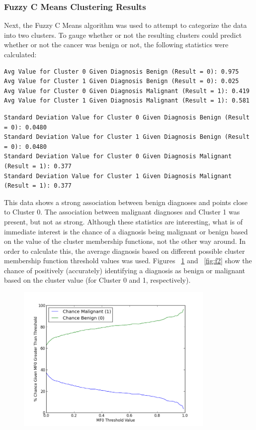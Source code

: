 \documentclass{article}
\begin{document}
\subsubsection*{Fuzzy C Means Clustering Results}
Next, the Fuzzy C Means algorithm was used to attempt to categorize the data 
into two clusters.  To gauge whether or not the resulting clusters could 
predict whether or not the cancer was benign or not, the following statistics were calculated:
\vspace*{1\baselineskip}      
\begin{verbatim}
Avg Value for Cluster 0 Given Diagnosis Benign (Result = 0): 0.975
Avg Value for Cluster 1 Given Diagnosis Benign (Result = 0): 0.025
Avg Value for Cluster 0 Given Diagnosis Malignant (Result = 1): 0.419
Avg Value for Cluster 1 Given Diagnosis Malignant (Result = 1): 0.581
\end{verbatim}
\vspace*{1\baselineskip}      
\begin{verbatim}
Standard Deviation Value for Cluster 0 Given Diagnosis Benign (Result = 0): 0.0480
Standard Deviation Value for Cluster 1 Given Diagnosis Benign (Result = 0): 0.0480
Standard Deviation Value for Cluster 0 Given Diagnosis Malignant (Result = 1): 0.377
Standard Deviation Value for Cluster 1 Given Diagnosis Malignant (Result = 1): 0.377
\end{verbatim}
\vspace*{1\baselineskip}      
This data shows a strong association between benign diagnoses and points 
close to Cluster 0.  The association between malignant diagnoses and Cluster 1 was present, but not as strong.
Although these statistics are interesting, what is of immediate interest is 
the chance of a diagnosis being malignant or benign based on the value of the 
cluster membership functions, not the other way around.  In order to calculate 
this, the average diagnosis based on different possible cluster membership 
function threshold values was used.  Figures ~\ref{fig:f1} and ~\ref{fig:f2} 
show the chance of positively (accurately) identifying a diagnosis as benign 
or malignant based on the cluster value (for Cluster 0 and 1, respectively).
\begin{figure}[h!]
  \centering
    \includegraphics[width=0.85\textwidth]{figure_1.png}
  \label{fig:f1}
\end{figure}
\end{document}
